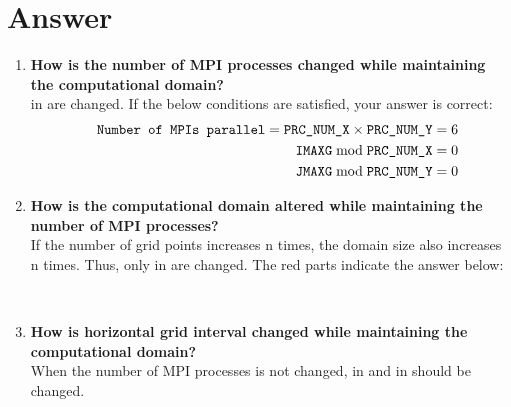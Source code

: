 
\clearpage
\section*{Answer}
\begin{enumerate}
\item {\bf How is the number of MPI processes changed while maintaining the computational domain?}\\
 in  are changed.
If the below conditions are satisfied, your answer is correct:
\begin{eqnarray}
&& \verb|Number of MPIs parallel| = \nmitemeq{PRC_NUM_X} \times \nmitemeq{PRC_NUM_Y} = 6 \nonumber\\
&& \nmitemeq{IMAXG} \bmod \nmitemeq{PRC_NUM_X} = 0 \nonumber\\
&& \nmitemeq{JMAXG} \bmod \nmitemeq{PRC_NUM_Y} = 0 \nonumber
\end{eqnarray}


\item {\bf How is the computational domain altered while maintaining the number of MPI processes?}\\
If the number of grid points increases n times, the domain size also increases n times.
Thus, only  in  are changed.
The red parts indicate the answer below:

\\

\item {\bf How is horizontal grid interval changed while maintaining the computational domain?}\\
When the number of MPI processes is not changed,  in  and  in  should be changed.


\end{enumerate}

